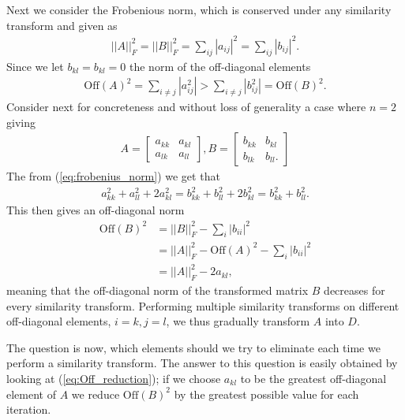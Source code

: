 \documentclass[twocolumn]{aastex62}
\begin{document}
Next we consider the Frobenious norm, which is conserved under any similarity transform and given as
\begin{align}
	||A||_F^2 = ||B||_F^2 = \sum_{ij}|a_{ij}|^2 = \sum_{ij}|b_{ij}|^2.
	\label{eq:frobenius_norm}
\end{align}
Since we let $b_{kl} = b_{kl} = 0$ the norm of the off-diagonal elements
\begin{align}
	\text{Off}(A)^2 = \sum_{i\neq j} |a_{ij}^2| > \sum_{i\neq j} |b_{ij}^2| = \text{Off}(B)^2.
\end{align}
Consider next for concreteness and without loss of generality a case where $n=2$ giving
\begin{align}
	A =
	\begin{bmatrix}
		a_{kk} & a_{kl}\\
		a_{lk} & a_{ll}
	\end{bmatrix},
	B =
	\begin{bmatrix}
		b_{kk} & b_{kl}\\
		b_{lk} & b_{ll}.
	\end{bmatrix}
\end{align}
The from (\ref{eq:frobenius_norm}) we get that
\begin{align}
	a_{kk}^2 + a_{ll}^2 + 2a_{kl}^2 = b_{kk}^2 + b_{ll}^2 + 2b_{kl}^2 = 		b_{kk}^2 + b_{ll}^2.
	\label{eq:frobenius_norm_n2}
\end{align}
This then gives an off-diagonal norm
\begin{align}
	\text{Off}(B)^2 &= ||B||_F^2 - \sum_i |b_{ii}|^2 \\
	&= ||A||_F^2 - \text{Off}(A)^2 - \sum_i |b_{ii}|^2 \\
	&= ||A||_F^2 - 2a_{kl},
	\label{eq:Off_reduction}
\end{align}
meaning that the off-diagonal norm of the transformed matrix $B$ decreases for every similarity transform. Performing multiple similarity transforms on different off-diagonal elements, $i = k, j = l$, we thus gradually transform $A$ into $D$.

The question is now, which elements should we try to eliminate each time we perform a similarity transform. The answer to this question is easily obtained by looking at (\ref{eq:Off_reduction}); if we choose $a_{kl}$ to be the greatest off-diagonal element of $A$ we reduce $\text{Off}(B)^2$ by the greatest possible value for each iteration.
\end{document}
